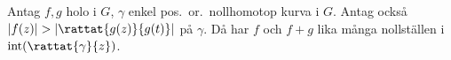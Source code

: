 \begin{theorem}
Antag $f, g$ holo i $G$, $\gamma$ enkel pos.\ or.\ nollhomotop kurva i $G$. Antag också $|f(z)| > |\rattat{g(z)}{g(t)}|$ på $\gamma$.
Då har $f$ och $f + g$ lika många nollställen i $\operatorname{int}(\rattat{\gamma}{z})$.
\end{theorem}
